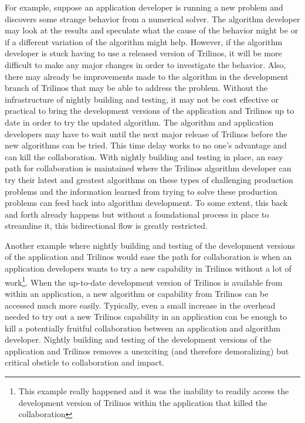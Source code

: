 \documentclass[pdf,ps2pdf,11pt]{SANDreport}
\begin{document}
For example, suppose an application developer is running a new problem and
discovers some strange behavior from a numerical solver.  The algorithm
developer may look at the results and speculate what the cause of the behavior
might be or if a different variation of the algorithm might help.
However, if the algorithm developer is stuck having to use a released version
of Trilinos, it will be more difficult to make any major changes in order to
investigate the behavior.  Also, there may already be improvements made to the
algorithm in the development branch of Trilinos that may be able to address
the problem.  Without the infrastructure of nightly building and testing, it
may not be cost effective or practical to bring the development versions of
the application and Trilinos up to date in order to try the updated algorithm.
The algorithm and application developers may have to wait until the next major
release of Trilinos before the new algorithms can be tried.  This time delay
works to no one's advantage and can kill the collaboration.  With nightly
building and testing in place, an easy path for collaboration is maintained
where the Trilinos algorithm developer can try their latest and greatest
algorithms on these types of challenging production problems and the
information learned from trying to solve these production problems can feed
back into algorithm development.  To some extent, this back and forth already
happens but without a foundational process in place to streamline it, this
bidirectional flow is greatly restricted.

Another example where nightly building and testing of the development versions
of the application and Trilinos would ease the path for collaboration is when
an application developers wants to try a new capability in Trilinos without a
lot of work\footnote{This example really happened and it was the inability to
readily access the development version of Trilinos within the application
that killed the collaboration}.  When the up-to-date development version of
Trilinos is available from within an application, a new algorithm or
capability from Trilinos can be accessed much more easily.  Typically, even a
small increase in the overhead needed to try out a new Trilinos capability in
an application can be enough to kill a potentially fruitful collaboration
between an application and algorithm developer.  Nightly building and testing
of the development versions of the application and Trilinos removes a
unexciting (and therefore demoralizing) but critical obsticle to collaboration
and impact.
\end{document}

